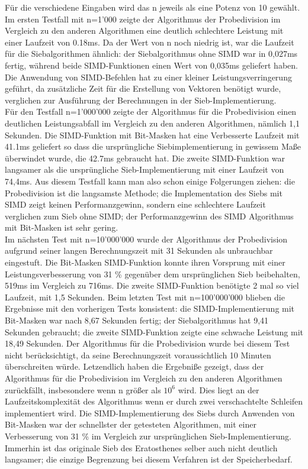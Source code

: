 \documentclass[course=erap]{aspdoc}
\begin{document}
Für die verschiedene Eingaben wird das n jeweils als eine Potenz von 10 gewählt. 
Im ersten Testfall mit n=1'000 zeigte der Algorithmus der Probedivision im Vergleich zu den anderen Algorithmen eine deutlich schlechtere Leistung mit einer Laufzeit von 0.18ms. Da der Wert von n noch niedrig ist, war die Laufzeit für die Siebalgorithmen ähnlich: der Siebalgorithmus ohne SIMD war in 0,027ms fertig, während beide SIMD-Funktionen einen Wert von 0,035ms geliefert haben. Die Anwendung von SIMD-Befehlen hat zu einer kleiner Leistungsverringerung geführt, da zusätzliche Zeit für die Erstellung von Vektoren benötigt wurde, verglichen zur Ausführung der Berechnungen in der Sieb-Implementierung. \\
Für den Testfall n=1'000'000 zeigte der Algorithmus für die Probedivision einen deutlichen Leistungsabfall im Vergleich zu den anderen Algorithmen, nämlich 1,1 Sekunden. Die SIMD-Funktion mit Bit-Masken hat eine  Verbesserte Laufzeit mit 41.1ms geliefert so dass die ursprüngliche Siebimplementierung in gewissem Maße überwindet wurde, die 42.7ms gebraucht hat. Die zweite SIMD-Funktion war langsamer als die ursprüngliche Sieb-Implementierung mit einer Laufzeit von 74,4ms. Aus diesem Testfall kann man also schon einige Folgerungen ziehen: die Probedivision ist die langsamste Methode; die Implementation des Siebs mit SIMD zeigt keinen Performanzgewinn, sondern eine schlechtere Laufzeit verglichen zum Sieb ohne SIMD; der Performanzgewinn des SIMD Algorithmus mit Bit-Masken ist sehr gering. \\
Im nächsten Test mit n=10'000'000 wurde der Algorithmus der Probedivision aufgrund seiner langen Berechnungszeit mit 31 Sekunden als unbrauchbar eingestuft. Die Bit-Masken SIMD-Funktion konnte ihren Vorsprung mit einer Leistungsverbesserung von 31 \% gegenüber dem ursprünglichen Sieb beibehalten, 519ms im Vergleich zu 716ms. Die zweite SIMD-Funktion benötigte 2 mal so viel Laufzeit, mit 1,5 Sekunden. 
Beim letzten Test mit n=100'000'000 blieben die Ergebnisse mit den vorherigen Tests konsistent: die SIMD-Implementierung mit Bit-Masken war nach 8,67 Sekunden fertig; der Siebalgorithmus hat 9,41 Sekunden gebraucht; die zweite SIMD-Funktion zeigte eine schwache Leistung mit 18,49 Sekunden. Der Algorithmus für die Probedivision wurde bei diesem Test nicht berücksichtigt, da seine Berechnungszeit voraussichtlich 10 Minuten überschreiten würde. Letzendlich haben die Ergebniße gezeigt, dass der Algorithmus für die Probedivision im Vergleich zu den anderen Algorithmen zurückfällt, insbesondere wenn n größer als $10^6$ wird. Dies liegt an der Laufzeitskomplexität des Algorithmus wenn er durch zwei verschachtelte Schleifen implementiert wird. Die SIMD-Implementierung des Siebs durch Anwenden von Bit-Masken war der schnellster der getesteten Algorithmen, mit einer Verbesserung von 31 \% im Vergleich zur ursprünglichen Sieb-Implementierung. Immerhin ist das originale Sieb des Eratosthenes selber auch nicht deutlich langsamer; die einzige Begrenzung bei diesem Verfahren ist der Speicherbedarf.
\end{document}
